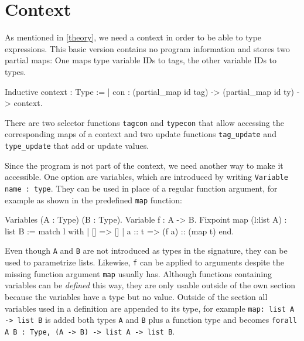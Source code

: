 \documentclass[fleqn, abstract=on]{scrreprt}
\newcommand{\coqinline}[1]{\texttt{#1}}
\begin{document}
\section{Context}
As mentioned in \autoref{theory}, we need a context in order to be able to type expressions. This basic version contains no program information and stores two partial maps: One maps type variable IDs to tags, the other variable IDs to types. 
\begin{coqcode}
Inductive context : Type := 
| con : (partial_map id tag) -> (partial_map id ty) -> context.
\end{coqcode}
There are two selector functions \coqinline{tagcon} and \coqinline{typecon} that allow accessing the corresponding maps of a context and two update functions \coqinline{tag_update} and \coqinline{type_update} that add or update values.
\par
Since the program is not part of the context, we need another way to make it accessible. One option are variables, which are introduced by writing \coqinline{Variable name : type}. They can be used in place of a regular function argument, for example as shown in the predefined \coqinline{map} function:
\begin{coqcode}
Variables (A : Type) (B : Type).
Variable f : A -> B.
Fixpoint map (l:list A) : list B :=
  match l with
  | [] => []
  | a :: t => (f a) :: (map t)
  end.
\end{coqcode}
Even though \coqinline{A} and \coqinline{B} are not introduced as types in the signature, they can be used to parametrize lists. Likewise, \coqinline{f} can be applied to arguments despite the missing function argument \coqinline{map} usually has. Although functions containing variables can be \textit{defined} this way, they are only usable outside of the own section because the variables have a type but no value. Outside of the section all variables used in a definition are appended to its type, for example \coqinline{map: list A -> list B} is added both types \texttt{A} and \texttt{B} plus a function type and becomes \coqinline{forall A B : Type, (A -> B) -> list A -> list B}.
\end{document}

